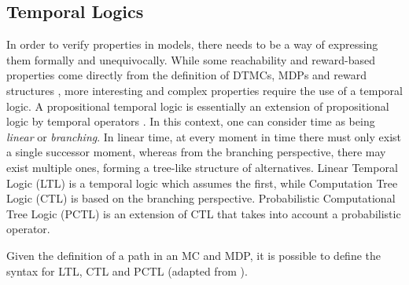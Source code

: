 \subsection{Temporal Logics}
\label{sec:temp_logics}

In order to verify properties in models, there needs to be a way of expressing them formally and unequivocally. While some reachability and reward-based properties come directly from the definition of DTMCs, MDPs and reward structures \cite{fknp11}, more interesting and complex properties require the use of a temporal logic. A propositional temporal logic is essentially an extension of propositional logic by temporal operators \cite{bk08}. In this context, one can consider time as being \textit{linear} or \textit{branching}. In linear time, at every moment in time there must only exist a single successor moment, whereas from the branching perspective, there may exist multiple ones, forming a tree-like structure of alternatives. Linear Temporal Logic (LTL) is a temporal logic which assumes the first, while Computation Tree Logic (CTL) is based on the branching perspective. Probabilistic Computational Tree Logic (PCTL) is an extension of CTL that takes into account a probabilistic operator.

Given the definition of a path in an MC and MDP, it is possible to define the syntax for LTL, CTL and PCTL (adapted from \cite{bk08, fknp11}).

